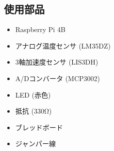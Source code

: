 \documentclass[a4paper,11pt,dvipdfmx]{jsarticle}
\begin{document}
\subsection{使用部品}
\begin{itemize}
    \item Raspberry Pi 4B
    \item アナログ温度センサ (LM35DZ)
    \item 3軸加速度センサ (LIS3DH)
    \item A/Dコンバータ (MCP3002)
    \item LED (赤色)
    \item 抵抗 (330Ω)
    \item ブレッドボード
    \item ジャンパー線
\end{itemize}
\end{document}
